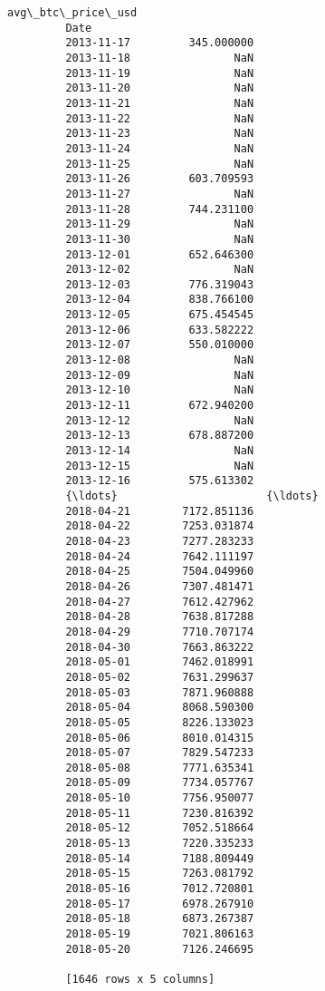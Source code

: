 \documentclass[11pt]{article}
\begin{document}
\begin{Verbatim}[commandchars=\\\{\}]
                     avg\_btc\_price\_usd  
         Date                           
         2013-11-17         345.000000  
         2013-11-18                NaN  
         2013-11-19                NaN  
         2013-11-20                NaN  
         2013-11-21                NaN  
         2013-11-22                NaN  
         2013-11-23                NaN  
         2013-11-24                NaN  
         2013-11-25                NaN  
         2013-11-26         603.709593  
         2013-11-27                NaN  
         2013-11-28         744.231100  
         2013-11-29                NaN  
         2013-11-30                NaN  
         2013-12-01         652.646300  
         2013-12-02                NaN  
         2013-12-03         776.319043  
         2013-12-04         838.766100  
         2013-12-05         675.454545  
         2013-12-06         633.582222  
         2013-12-07         550.010000  
         2013-12-08                NaN  
         2013-12-09                NaN  
         2013-12-10                NaN  
         2013-12-11         672.940200  
         2013-12-12                NaN  
         2013-12-13         678.887200  
         2013-12-14                NaN  
         2013-12-15                NaN  
         2013-12-16         575.613302  
         {\ldots}                       {\ldots}  
         2018-04-21        7172.851136  
         2018-04-22        7253.031874  
         2018-04-23        7277.283233  
         2018-04-24        7642.111197  
         2018-04-25        7504.049960  
         2018-04-26        7307.481471  
         2018-04-27        7612.427962  
         2018-04-28        7638.817288  
         2018-04-29        7710.707174  
         2018-04-30        7663.863222  
         2018-05-01        7462.018991  
         2018-05-02        7631.299637  
         2018-05-03        7871.960888  
         2018-05-04        8068.590300  
         2018-05-05        8226.133023  
         2018-05-06        8010.014315  
         2018-05-07        7829.547233  
         2018-05-08        7771.635341  
         2018-05-09        7734.057767  
         2018-05-10        7756.950077  
         2018-05-11        7230.816392  
         2018-05-12        7052.518664  
         2018-05-13        7220.335233  
         2018-05-14        7188.809449  
         2018-05-15        7263.081792  
         2018-05-16        7012.720801  
         2018-05-17        6978.267910  
         2018-05-18        6873.267387  
         2018-05-19        7021.806163  
         2018-05-20        7126.246695  
         
         [1646 rows x 5 columns]
\end{Verbatim}
            
\end{document}
